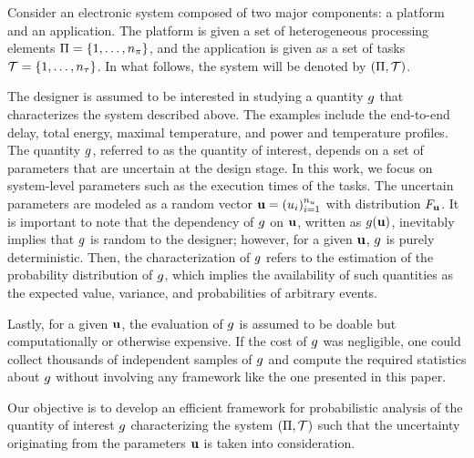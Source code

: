 Consider an electronic system composed of two major components: a platform and
an application. The platform is given a set of heterogeneous processing elements
$\Pi = \{ 1, \dots, {n_\pi} \}$, and the application is given as a set of tasks
$\mathcal{T} = \{ 1, \dots, {n_\tau} \}$. In what follows, the system will be denoted by
$(\Pi, \mathcal{T})$.

The designer is assumed to be interested in studying a quantity $g$ that
characterizes the system described above. The examples include the end-to-end
delay, total energy, maximal temperature, and power and temperature profiles.
The quantity $g$, referred to as the quantity of interest, depends on a set of
parameters that are uncertain at the design stage. In this work, we focus on
system-level parameters such as the execution times of the tasks. The uncertain
parameters are modeled as a random vector $\mathbf{u} = (u_i)_{i = 1}^{n_u}$ with
distribution $F_{\mathbf{u}}$. It is important to note that the dependency of
$g$ on $\mathbf{u}$, written as $g(\mathbf{u})$, inevitably implies that $g$ is random to
the designer; however, for a given $\mathbf{u}$, $g$ is purely deterministic. Then,
the characterization of $g$ refers to the estimation of the probability
distribution of $g$, which implies the availability of such quantities as the
expected value, variance, and probabilities of arbitrary events.

Lastly, for a given $\mathbf{u}$, the evaluation of $g$ is assumed to be doable but
computationally or otherwise expensive. If the cost of $g$ was negligible, one
could collect thousands of independent samples of $g$ and compute the required
statistics about $g$ without involving any framework like the one presented in
this paper.

Our objective is to develop an efficient framework for probabilistic analysis of
the quantity of interest $g$ characterizing the system $(\Pi, \mathcal{T})$ such
that the uncertainty originating from the parameters $\mathbf{u}$ is taken into
consideration.
